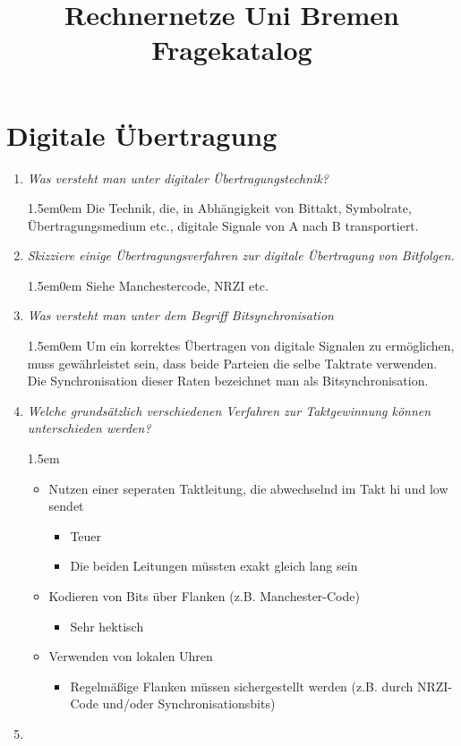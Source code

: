\documentclass[hidelinks]{article}
\title{Rechnernetze Uni Bremen Fragekatalog}
\newcommand{\lmargin}{1.5em}
\begin{document}
\maketitle
\section{Digitale Übertragung}
\begin{enumerate}
\item \textit{Was versteht man unter digitaler Übertragungstechnik?}
\begin{adjustwidth}{\lmargin}{0em}
	Die Technik, die, in Abhängigkeit von Bittakt, Symbolrate, Übertragungsmedium etc., digitale Signale von A nach B transportiert. %
\end{adjustwidth}
\item \textit{Skizziere einige Übertragungsverfahren zur digitale Übertragung von Bitfolgen.}
\begin{adjustwidth}{\lmargin}{0em}
	Siehe Manchestercode, NRZI etc. %
\end{adjustwidth}
\item \textit{Was versteht man unter dem Begriff Bitsynchronisation}
\begin{adjustwidth}{\lmargin}{0em}
	Um ein korrektes Übertragen von digitale Signalen zu ermöglichen, muss gewährleistet sein, dass beide Parteien die selbe Taktrate verwenden. Die Synchronisation dieser Raten bezeichnet man als Bitsynchronisation.
\end{adjustwidth}
\item \textit{Welche grundsätzlich verschiedenen Verfahren zur Taktgewinnung können unterschieden werden?}
\begin{adjustwidth}{\lmargin}{}
\begin{itemize}
	\item Nutzen einer seperaten Taktleitung, die abwechselnd im Takt hi und low sendet 
	\begin{itemize}
		\item Teuer
		\item Die beiden Leitungen müssten exakt gleich lang sein
	\end{itemize}
	\item Kodieren von Bits über Flanken (z.B. Manchester-Code)
	\begin{itemize}
		\item Sehr hektisch
	\end{itemize}
	\item Verwenden von lokalen Uhren
	\begin{itemize}
		\item Regelmäßige Flanken müssen sichergestellt werden (z.B. durch NRZI-Code und/oder Synchronisationsbits)
	\end{itemize}
\end{itemize}
\end{adjustwidth}
\item \textit{}
\end{enumerate}
\end{document}

